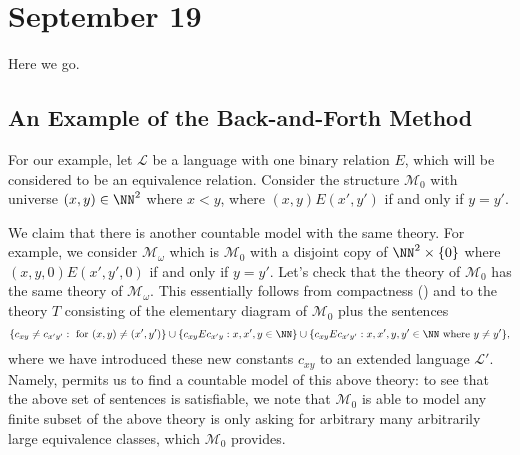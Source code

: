 \documentclass[../notes.tex]{subfiles}
\begin{document}
\section{September 19}

Here we go.

\subsection{An Example of the Back-and-Forth Method}
For our example, let $\mathcal L$ be a language with one binary relation $E$, which will be considered to be an equivalence relation. Consider the structure $\mathcal M_0$ with universe $(x,y)\in\NN^2$ where $x<y$, where $(x,y)E(x',y')$ if and only if $y=y'$.

We claim that there is another countable model with the same theory. For example, we consider $\mathcal M_\omega$ which is $\mathcal M_0$ with a disjoint copy of $\NN^2\times\{0\}$ where $(x,y,0)E(x',y',0)$ if and only if $y=y'$. Let's check that the theory of $\mathcal M_0$ has the same theory of $\mathcal M_\omega$. This essentially follows from compactness () and  to the theory $T$ consisting of the elementary diagram of $\mathcal M_0$ plus the sentences
\[\{c_{xy}\ne c_{x'y'}:\text{ for }(x,y)\ne(x',y')\}\cup\{c_{xy}Ec_{x'y}:x,x',y\in\NN\}\cup\{c_{xy}Ec_{x'y'}:x,x',y,y'\in\NN\text{ where }y\ne y'\},\]
where we have introduced these new constants $c_{xy}$ to an extended language $\mathcal L'$. Namely,  permits us to find a countable model of this above theory: to see that the above set of sentences is satisfiable, we note that $\mathcal M_0$ is able to model any finite subset of the above theory is only asking for arbitrary many arbitrarily large equivalence classes, which $\mathcal M_0$ provides.
\end{document}
